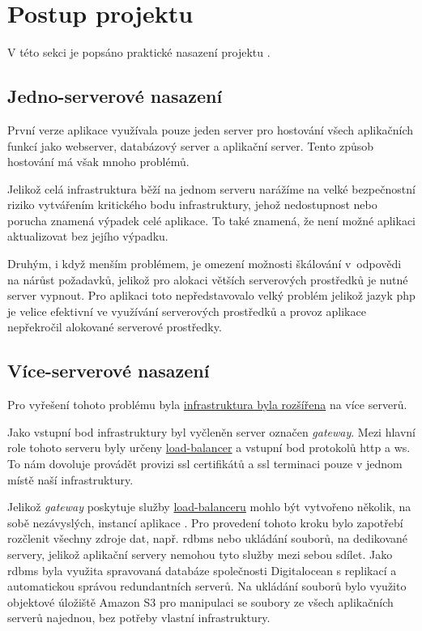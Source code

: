 
\section{Postup projektu}

V této sekci je popsáno praktické nasazení projektu \bso{}.

\subsection{Jedno-serverové nasazení}\label{sub:one-server}

První verze aplikace \bso{} využívala pouze jeden server pro hostování všech aplikačních funkcí jako \acrshort{webserver}, databázový server a aplikační server. Tento způsob hostování má však mnoho problémů.

Jelikož celá infrastruktura běží na jednom serveru narážíme na velké bezpečnostní riziko vytvářením kritického bodu infrastruktury, jehož nedostupnost nebo porucha znamená výpadek celé aplikace. 
To také znamená, že není možné aplikaci aktualizovat bez jejího výpadku. 

Druhým, i když menším problémem, je omezení možnosti škálování v~odpovědi na nárůst požadavků, jelikož pro alokaci větších serverových prostředků je nutné server vypnout.
Pro aplikaci \bso{} toto nepředstavovalo velký problém jelikož jazyk \acrshort{php} je velice efektivní ve využívání serverových prostředků a provoz aplikace nepřekročil alokované serverové prostředky.

\subsection{Více-serverové nasazení}\label{sub:multi-server}

Pro vyřešení tohoto problému byla \hyperref[fig:servery]{infrastruktura byla rozšířena} na více serverů. 

Jako vstupní bod infrastruktury byl vyčleněn server označen \textit{gateway}.
Mezi hlavní role tohoto serveru byly určeny \hyperref[sub:load-balancing]{load-balancer} a vstupní bod protokolů \acrshort{http} a \acrshort{ws}.
To nám dovoluje provádět provizi ssl certifikátů a ssl terminaci pouze v jednom místě naší infrastruktury.

Jelikož \textit{gateway} poskytuje služby \hyperref[sub:load-balancing]{load-balanceru} mohlo být vytvořeno několik, na sobě nezávyslých, instancí aplikace \bso{}.
Pro provedení tohoto kroku bylo zapotřebí rozčlenit všechny zdroje dat, např. \acrshort{rdbms} nebo ukládání souborů, na dedikované servery, jelikož aplikační servery nemohou tyto služby mezi sebou sdílet.
Jako \acrshort{rdbms} byla využita spravovaná databáze společnosti Digitalocean s replikací a automatickou správou redundantních serverů.
Na ukládání souborů bylo využito objektové úložiště Amazon S3 pro manipulaci se soubory ze všech aplikačních serverů najednou, bez potřeby vlastní infrastruktury.

